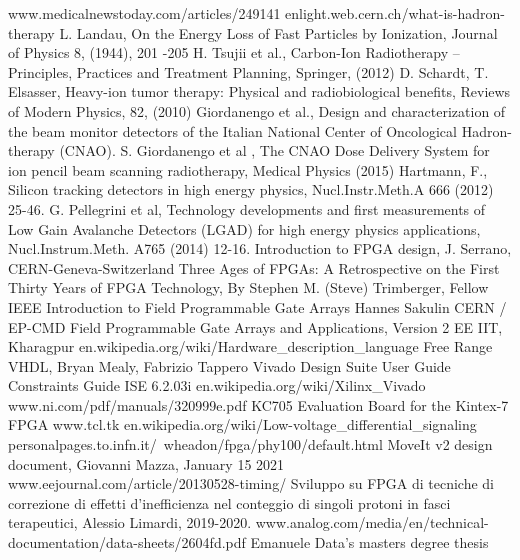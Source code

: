\begin{thebibliography}{00}	
	www.medicalnewstoday.com/articles/249141
	enlight.web.cern.ch/what-is-hadron-therapy
	L. Landau, On the Energy Loss of Fast Particles by Ionization, Journal of
	Physics 8, (1944), 201 -205
	H. Tsujii et al., Carbon-Ion Radiotherapy – Principles, Practices and Treatment
	Planning, Springer, (2012)
	D. Schardt, T. Elsasser, Heavy-ion tumor therapy: Physical and radiobiological
	benefits, Reviews of Modern Physics, 82, (2010)
	Giordanengo et al., Design and characterization of the beam monitor detectors
	of the Italian National Center of Oncological Hadron-therapy (CNAO).
	S. Giordanengo et al , The CNAO Dose Delivery System for ion pencil beam
	scanning radiotherapy, Medical Physics (2015)
	Hartmann, F., Silicon tracking detectors in high energy physics, Nucl.Instr.Meth.A
	666 (2012) 25-46.
	G. Pellegrini et al, Technology developments and first measurements of Low Gain Avalanche Detectors (LGAD) for high energy physics applications, Nucl.Instrum.Meth. A765 (2014) 12-16.
	Introduction to FPGA design, J. Serrano, CERN-Geneva-Switzerland
	Three Ages of FPGAs: A Retrospective on the First Thirty Years of FPGA Technology, By Stephen M. (Steve) Trimberger, Fellow IEEE
	Introduction to Field Programmable Gate Arrays Hannes Sakulin CERN / EP-CMD
	Field Programmable Gate Arrays and Applications, Version 2 EE IIT, Kharagpur
	en.wikipedia.org/wiki/Hardware\_description\_language
	Free Range VHDL, Bryan Mealy, Fabrizio Tappero
	Vivado Design Suite User Guide
	Constraints Guide ISE 6.2.03i
	en.wikipedia.org/wiki/Xilinx\_Vivado
	www.ni.com/pdf/manuals/320999e.pdf
	KC705 Evaluation Board for the Kintex-7 FPGA	
	www.tcl.tk
	en.wikipedia.org/wiki/Low-voltage\_differential\_signaling
	personalpages.to.infn.it/~wheadon/fpga/phy100/default.html
	MoveIt v2 design document, Giovanni Mazza, January 15 2021
	www.eejournal.com/article/20130528-timing/
	Sviluppo su FPGA di tecniche di correzione di effetti d'inefficienza nel conteggio di singoli protoni in fasci terapeutici, Alessio Limardi, 2019-2020.
	www.analog.com/media/en/technical-documentation/data-sheets/2604fd.pdf
	Emanuele Data's masters degree thesis 
	
	
\end{thebibliography}
